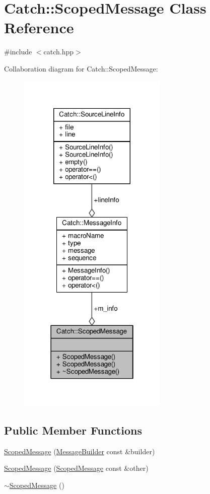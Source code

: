 \hypertarget{class_catch_1_1_scoped_message}{\section{Catch\-:\-:Scoped\-Message Class Reference}
\label{class_catch_1_1_scoped_message}
}


{\ttfamily \#include $<$catch.\-hpp$>$}



Collaboration diagram for Catch\-:\-:Scoped\-Message\-:
\nopagebreak
\begin{figure}[H]
\begin{center}
\leavevmode
\includegraphics[width=202pt]{class_catch_1_1_scoped_message__coll__graph}
\end{center}
\end{figure}
\subsection*{Public Member Functions}
\begin{DoxyCompactItemize}
\item 
\hyperlink{class_catch_1_1_scoped_message_a5cc59f0f2ebe840e6607f83004d49a17}{Scoped\-Message} (\hyperlink{struct_catch_1_1_message_builder}{Message\-Builder} const \&builder)
\item 
\hyperlink{class_catch_1_1_scoped_message_ae03a17fd47220d563d4abc73e7518e29}{Scoped\-Message} (\hyperlink{class_catch_1_1_scoped_message}{Scoped\-Message} const \&other)
\item 
\hyperlink{class_catch_1_1_scoped_message_a43190843f9eeb84a0b42b0bc95fdf93a}{$\sim$\-Scoped\-Message} ()
\end{DoxyCompactItemize}
